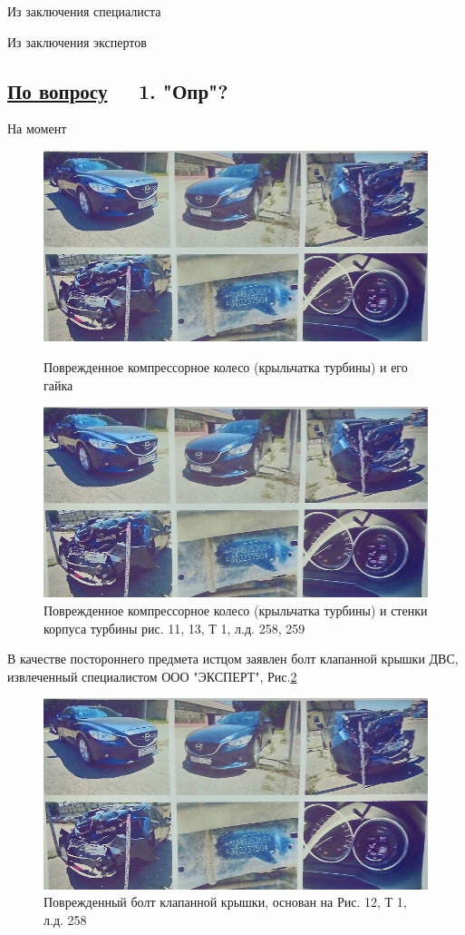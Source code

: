Из заключения специалиста  

\vspace{\baselineskip}
%
%
Из заключения экспертов  

\vspace{\baselineskip}
\renewcommand\baselinestretch{0.86}\small\normalsize 
\subsection{\underline{По  вопросу}\, \, \,	\textbf{\small{1. "Опр"?}}}
\renewcommand\baselinestretch{1.2}\small\normalsize
На момент 

 \begin{figure}[H]\centering
	\parbox[t]{0.49\textwidth}
	{\centering
		\includegraphics[width=.49\textwidth]{images/k1}
		\caption{\footnotesize {Поврежденное компрессорное колесо (крыльчатка турбины) и его  гайка  }}
		\label{ris:images/k1}}
	\hfil \hfil
	\parbox[t]{0.49\textwidth}
	{\centering
		\includegraphics[width=.49\textwidth]{images/k2}
				\caption{\footnotesize {Поврежденное компрессорное колесо (крыльчатка турбины) и стенки корпуса турбины
				рис. 11, 13, Т 1, л.д. 258, 259}}
		\label{ris:images/k2}}
	
\end{figure}

В качестве постороннего предмета истцом заявлен болт клапанной крышки ДВС, извлеченный специалистом ООО "ЭКСПЕРТ",  Рис.\ref{ris:images/b1}
\vspace{\baselineskip}  %

  \begin{figure}[!h]
	\centering
	\includegraphics[width=0.95\linewidth]{images/b1}
	\caption{{\footnotesize {Поврежденный болт клапанной крышки, основан на Рис. 12, Т 1, л.д. 258}}}
	\label{ris:images/b1}
\end{figure}

